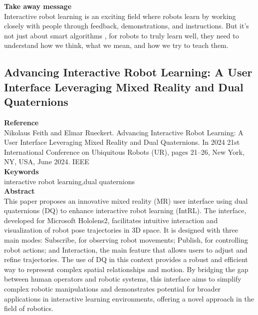 \documentclass[report.tex]{subfiles}
\begin{document}
\noindent\textbf{Take away message}  \\
Interactive robot learning is an exciting field where robots learn by working closely with people through feedback, demonstrations, and instructions. But it’s not just about smart algorithms , for robots to truly learn well, they need to understand how we think, what we mean, and how we try to teach them.

















\subsection{Advancing Interactive Robot Learning: A User Interface Leveraging  Mixed Reality and Dual Quaternions} 

\noindent\textbf{Reference} \\
\cite{feith_advancing_2024}Nikolaus Feith and Elmar Rueckert. Advancing Interactive Robot Learning: A User Interface
Leveraging Mixed Reality and Dual Quaternions. In 2024 21st International Conference on Ubiquitous
Robots (UR), pages 21–26, New York, NY, USA, June 2024. IEEE \\


\noindent\textbf{Keywords} \\
interactive robot learning,dual quaternions
   \\

\noindent\textbf{Abstract} \\
This paper proposes an innovative mixed reality (MR) user interface using dual quaternions (DQ) to enhance interactive robot learning (IntRL). The interface, developed for Microsoft Hololens2, facilitates intuitive interaction and visualization of robot pose trajectories in 3D space. It is designed with three main modes: Subscribe, for observing robot movements; Publish, for controlling robot actions; and Interaction, the main feature that allows users to adjust and refine trajectories. The use of DQ in this context provides a robust and efficient way to represent complex spatial relationships and motion. By bridging the gap between human operators and robotic systems, this interface aims to simplify complex robotic manipulations and demonstrates potential for broader applications in interactive learning environments, offering a novel approach in the field of robotics.\\
\end{document}
